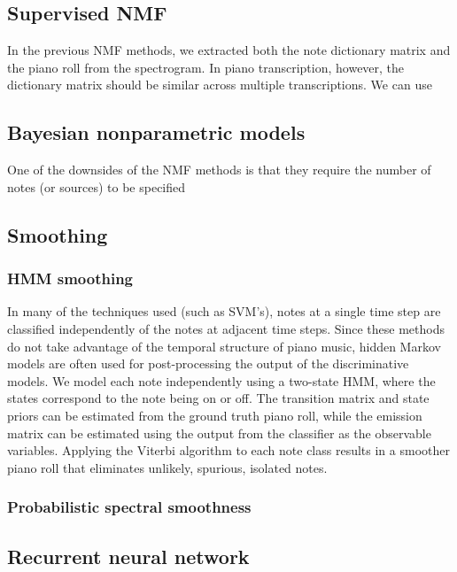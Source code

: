 \documentclass[5p]{elsarticle}
\begin{document}

\subsection{Supervised NMF}

In the previous NMF methods, we extracted both the note dictionary matrix and the piano roll from the spectrogram. In piano transcription, however, the dictionary matrix should be similar across multiple transcriptions. We can use 



\subsection{Bayesian nonparametric models}
One of the downsides of the NMF methods is that they require the number of notes (or sources) to be specified 


\subsection{Smoothing}
\subsubsection{HMM smoothing}
In many of the techniques used (such as SVM's), notes at a single time step are classified independently of the notes at adjacent time steps. Since these methods do not take advantage of the temporal structure of piano music, hidden Markov models are often used for post-processing the output of the discriminative models. We model each note independently using a two-state HMM, where the states correspond to the note being on or off. The transition matrix and state priors can be estimated from the ground truth piano roll, while the emission matrix can be estimated using the output from the classifier as the observable variables. Applying the Viterbi algorithm to each note class results in a smoother piano roll that eliminates unlikely, spurious, isolated notes. 

\subsubsection{Probabilistic spectral smoothness}


\subsection{Recurrent neural network}
\end{document}
